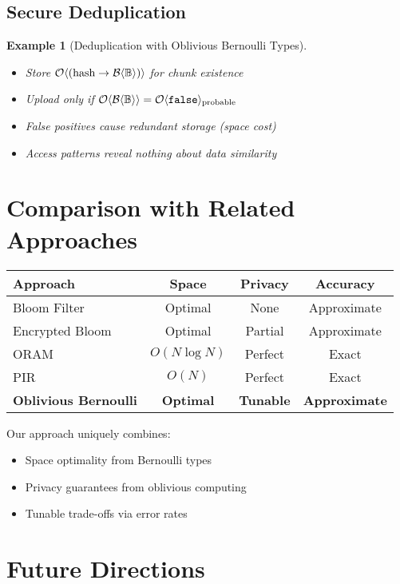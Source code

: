 \documentclass[11pt,final]{article}
\newcommand{\BernBool}{\mathcal{B}\langle \Bool \rangle}
\newtheorem{example}[theorem]{Example}
\begin{document}
\subsection{Secure Deduplication}

\begin{example}[Deduplication with Oblivious Bernoulli Types]
\begin{itemize}
    \item Store $\ObvMap{\text{hash}}{\BernBool}$ for chunk existence
    \item Upload only if $\Obv{\BernBool} = \Obv{\False}_{\text{probable}}$
    \item False positives cause redundant storage (space cost)
    \item Access patterns reveal nothing about data similarity
\end{itemize}
\end{example}

\section{Comparison with Related Approaches}

\begin{center}
\begin{tabular}{lccc}
\toprule
\textbf{Approach} & \textbf{Space} & \textbf{Privacy} & \textbf{Accuracy} \\
\midrule
Bloom Filter & Optimal & None & Approximate \\
Encrypted Bloom & Optimal & Partial & Approximate \\
ORAM & $O(N \log N)$ & Perfect & Exact \\
PIR & $O(N)$ & Perfect & Exact \\
\textbf{Oblivious Bernoulli} & \textbf{Optimal} & \textbf{Tunable} & \textbf{Approximate} \\
\bottomrule
\end{tabular}
\end{center}

Our approach uniquely combines:
\begin{itemize}
    \item Space optimality from Bernoulli types
    \item Privacy guarantees from oblivious computing
    \item Tunable trade-offs via error rates
\end{itemize}

\section{Future Directions}
\end{document}
